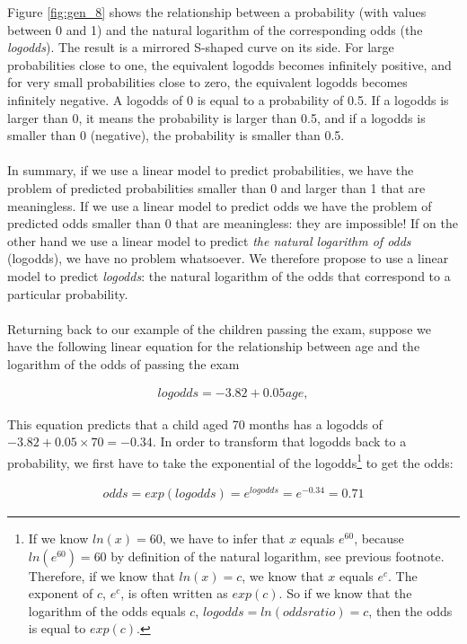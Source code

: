 \documentclass[]{report}\usepackage[]{graphicx}\usepackage[]{color}
\begin{document}
Figure \ref{fig:gen_8} shows the relationship between a probability (with values between 0 and 1) and the natural logarithm of the corresponding odds (the \textit{logodds}). The result is a mirrored S-shaped curve on its side. For large probabilities close to one, the equivalent logodds becomes infinitely positive, and for very small probabilities close to zero, the equivalent logodds becomes infinitely negative. A logodds of 0 is equal to a probability of 0.5. If a logodds is larger than 0, it means the probability is larger than 0.5, and if a logodds is smaller than 0 (negative), the probability is smaller than 0.5.
\\
\\
In summary, if we use a linear model to predict probabilities, we have the problem of predicted probabilities smaller than 0 and larger than 1 that are meaningless. If we use a linear model to predict odds we have the problem of predicted odds smaller than 0 that are meaningless: they are impossible! If on the other hand we use a linear model to predict \textit{the natural logarithm of odds} (logodds), we have no problem whatsoever. We therefore propose to use a linear model to predict \textit{logodds}: the natural logarithm of the odds that correspond to a particular probability.
\\
\\
Returning back to our example of the children passing the exam, suppose we have the following linear equation for the relationship between age and the logarithm of the odds of passing the exam


\begin{eqnarray}
logodds=-3.82 + 0.05 age, \nonumber
\end{eqnarray}


This equation predicts that a child aged 70 months has a logodds of $-3.82 + 0.05 \times 70 =-0.34$. In order to transform that logodds back to a probability, we first have to take the exponential of the logodds\footnote{If we know $ln(x)=60$, we have to infer that $x$ equals $e^{60}$, because $ln(e^{60})=60$ by definition of the natural logarithm, see previous footnote. Therefore, if we know that $ln(x)=c$, we know that $x$ equals $e^c$. The exponent of $c$, $e^c$, is often written as $exp(c)$. So if we know that the logarithm of the odds equals $c$, $logodds=ln(oddsratio)=c$, then the odds is equal to $exp(c)$.} to get the odds:


\begin{eqnarray}
odds = exp(logodds)= e^{logodds}=e^{-0.34}=0.71 \nonumber
\end{eqnarray}
\end{document}
